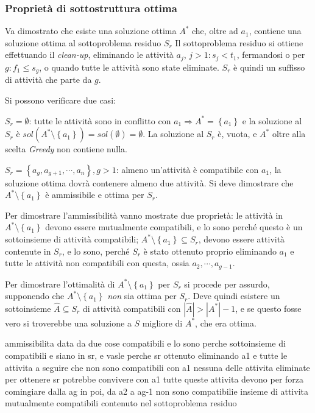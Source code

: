 \subsubsection{Proprietà di sottostruttura ottima}

Va dimostrato che esiste una soluzione ottima $A^*$ che, oltre ad $a_1$, contiene una soluzione ottima al sottoproblema residuo $S_r$
Il sottoproblema residuo si ottiene effettuando il \emph{clean-up}, eliminando le attività $a_j$, $j>1 : s_j < t_1$, fermandosi o per $g : f_1 \leq s_g$, o quando tutte le attività sono state eliminate. $S_r$ è quindi un suffisso di attività che parte da $g$.

Si possono verificare due casi:

$S_r = \emptyset $: tutte le attività sono in conflitto con $a_1 \Rightarrow A^*=\left\{ a_1 \right\}$
e la soluzione al $S_r$ è $sol( A^* \setminus \left\{ a_1 \right\} ) = sol ( \emptyset ) = \emptyset$.
La soluzione al $S_r$ è, vuota, e $A^*$ oltre alla scelta \emph{Greedy} non contiene nulla.

$S_r = \left\{ a_g, a_{g+1}, \cdots, a_n \right\}, g>1$: almeno un'attività è compatibile con $a_1$, la soluzione ottima dovrà contenere almeno due attività. Si deve dimostrare che $A^* \setminus \left\{ a_1 \right\}$ è ammissibile e ottima per $S_r$.

Per dimostrare l'ammissibilità vanno mostrate due proprietà: le attività in $A^* \setminus \left\{ a_1 \right\}$ devono essere mutualmente compatibili, e lo sono perché questo è un sottoinsieme di attività compatibili; $A^* \setminus \left\{ a_1 \right\} \subseteq S_r$, devono essere attività contenute in $S_r$, e lo sono, perché $S_r$ è stato ottenuto proprio eliminando $a_1$ e tutte le attività non compatibili con questa, ossia $a_2, \cdots, a_{g-1}$.

Per dimostrare l'ottimalità di $A^* \setminus \left\{ a_1 \right\}$ per $S_r$ si procede per assurdo, supponendo che $A^* \setminus \left\{ a_1 \right\}$ \emph{non} sia ottima per $S_r$. Deve quindi esistere un sottoinsieme $\hat{A} \subseteq S_r$ di attività compatibili con $|\hat{A}| > |A^*|-1$, e se questo fosse vero si troverebbe una soluzione a $S$ migliore di $A^*$, che era ottima.

ammissibilita data da due cose
compatibili e lo sono perche sottoinsieme di compatibili
e siano in sr, e vasle perche sr ottenuto eliminando a1 e tutte le attivita a seguire che non sono compatibili con a1
nessuna delle attivita eliminate per ottenere sr potrebbe convivere con a1
tutte queste attivita devono per forza comingiare dalla ag in poi, da a2 a ag-1 non sono compatibilie
insieme di attivita mutualmente compatibili contenuto nel sottoproblema residuo





